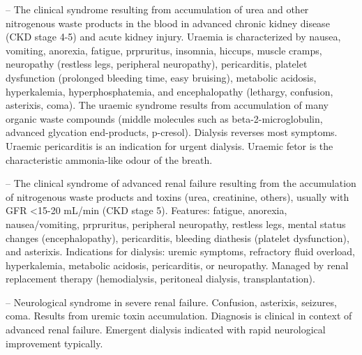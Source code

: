-- The clinical syndrome resulting from accumulation of urea and other nitrogenous waste products in the blood in advanced chronic kidney disease (CKD stage 4-5) and acute kidney injury. Uraemia is characterized by nausea, vomiting, anorexia, fatigue, prpruritus, insomnia, hiccups, muscle cramps, neuropathy (restless legs, peripheral neuropathy), pericarditis, platelet dysfunction (prolonged bleeding time, easy bruising), metabolic acidosis, hyperkalemia, hyperphosphatemia, and encephalopathy (lethargy, confusion, asterixis, coma). The uraemic syndrome results from accumulation of many organic waste compounds (middle molecules such as beta-2-microglobulin, advanced glycation end-products, p-cresol). Dialysis reverses most symptoms. Uraemic pericarditis is an indication for urgent dialysis. Uraemic fetor is the characteristic ammonia-like odour of the breath.

-- The clinical syndrome of advanced renal failure resulting from the accumulation of nitrogenous waste products and toxins (urea, creatinine, others), usually with GFR <15-20 mL/min (CKD stage 5). Features: fatigue, anorexia, nausea/vomiting, prpruritus, peripheral neuropathy, restless legs, mental status changes (encephalopathy), pericarditis, bleeding diathesis (platelet dysfunction), and asterixis. Indications for dialysis: uremic symptoms, refractory fluid overload, hyperkalemia, metabolic acidosis, pericarditis, or neuropathy. Managed by renal replacement therapy (hemodialysis, peritoneal dialysis, transplantation).

-- Neurological syndrome in severe renal failure. Confusion, asterixis, seizures, coma. Results from uremic toxin accumulation. Diagnosis is clinical in context of advanced renal failure. Emergent dialysis indicated with rapid neurological improvement typically.

